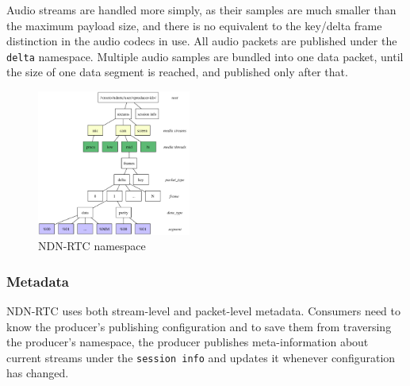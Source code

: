 \documentclass{icn/sig-alternate-2013} %
\newcommand{\ndnrtcName}{NDN-RTC} %
\begin{document}
Audio streams are handled more simply, as their samples are much smaller than the maximum payload size, and there is no equivalent to the key/delta frame distinction in the audio codecs in use. All audio packets are published under the \texttt{delta} namespace. Multiple audio samples are bundled into one data packet, until the size of one data segment is reached, and published only after that.

\begin{figure}[t!]
\centering
\includegraphics[width=0.45\textwidth]{namespace}
\caption{\ndnrtcName{} namespace}
\label{fig:namespace}
\end{figure}

\subsubsection{Metadata} 

\ndnrtcName{} uses both stream-level and packet-level metadata. 
Consumers need to know the producer's publishing configuration and to save them from traversing the producer's namespace, the producer publishes meta-information about current streams under the \texttt{session info} and updates it whenever configuration has changed.
\end{document}
